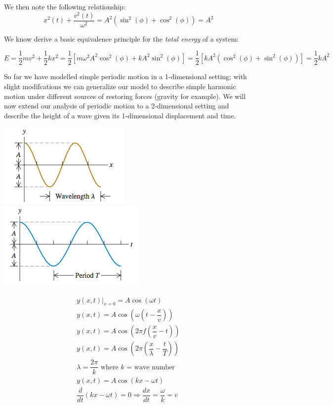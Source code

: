 \documentclass[11pt]{article}
\begin{document}
We then note the following relationship:
	\begin{equation}
	 x^2(t) + \dfrac{v^2(t)}{\omega^2} =
	 A^2(\sin ^2 (\phi) +\cos ^2 (\phi)) = A^2
	\end{equation}

\pagebreak

We know derive a basic equivalence principle for the \textsl{total energy} 
of a system:

	\begin{equation}
	E = \frac{1}{2}mv^2 + \frac{1}{2} kx^2 =
	\frac{1}{2} \left[ m \omega^2 A^2 \cos^2 (\phi) + kA^2 \sin^2 (\phi) \right] = 
	\frac{1}{2} \left[ kA^2 \left( \cos^2 (\phi) + \sin^2 (\phi) \right) \right] = 	
	\frac{1}{2} kA^2
	\end{equation}
	
So far we have modelled simple periodic motion in 
a 1-dimensional setting; with slight modifcations we can generalize
our model to describe simple harmonic motion under different sources
of restoring forces (gravity for example).
We will now extend our analysis of periodic motion to a 2-dimensional 
setting and describe the height of a wave given its 1-dimensional 
displacement and time.

\begin{center}
\includegraphics[scale=0.6]{wave1}
\includegraphics[scale=0.6]{wave2}
\end{center}

	\begin{eqnarray}
	\left. y(x,t) \right|_{x=0} = A \cos(\omega t) \\
	y(x,t) = A \cos(\omega \left( t - \dfrac{x}{v} \right)) \\
	y(x,t) = A \cos(2 \pi f \left( \dfrac{x}{v} - t \right)) \\
	y(x,t) = A \cos(2 \pi \left( \dfrac{x}{\lambda} - \dfrac{t}{T} \right)) \\	
	\lambda = \dfrac{2 \pi}{k} \textrm{ where $k$ = wave number} \\
	y(x,t) = A \cos( kx - \omega t) \\	
	\dfrac{d}{dt}(kx - \omega t) = 0 \Rightarrow
	\dfrac{dx}{dt} = \dfrac{\omega}{k} = v
	\end{eqnarray}
\end{document}
